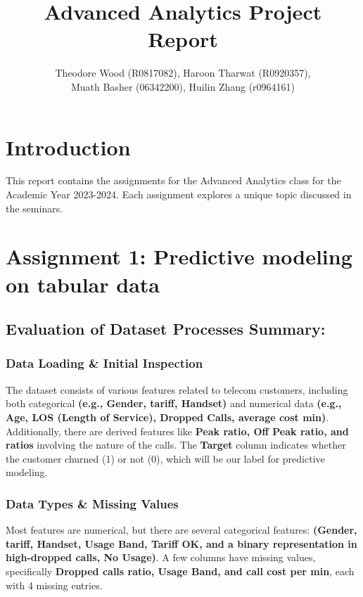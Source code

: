 \documentclass{article}
\title{Advanced Analytics Project Report}
\author{Theodore Wood (R0817082), Haroon Tharwat (R0920357), \\Muath Basher (06342200), Huilin Zhang (r0964161)}
\begin{document}
\maketitle

\section{Introduction}
This report contains the assignments for the Advanced Analytics class for the Academic Year 2023-2024. Each assignment explores a unique topic discussed in the seminars. \\


\section{Assignment 1: Predictive modeling on tabular data}



\subsection{Evaluation of Dataset Processes Summary:}


\subsubsection{Data Loading \& Initial Inspection}


The dataset consists of various features related to telecom customers, including both categorical \textbf{(e.g., Gender, tariff, Handset)} and numerical data \textbf{(e.g., Age, LOS (Length of Service), Dropped Calls, average cost min)}. Additionally, there are derived features like \textbf{Peak ratio, Off Peak ratio, and ratios} involving the nature of the calls. The \textbf{Target} column indicates whether the customer churned (1) or not (0), which will be our label for predictive modeling.


\subsubsection{Data Types \& Missing Values}

Most features are numerical, but there are several categorical features: \textbf{(Gender, tariff, Handset, Usage Band, Tariff OK, and a binary representation in high-dropped calls, No Usage)}. A few columns have missing values, specifically \textbf{Dropped calls ratio, Usage Band, and call cost per min}, each with 4 missing entries.
\end{document}
